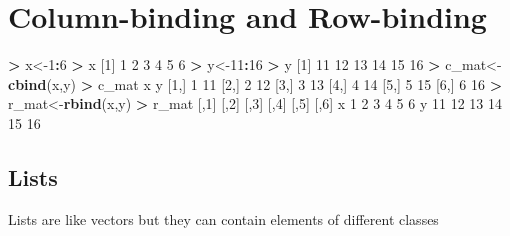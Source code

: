 \documentclass[]{article}
\newenvironment{Shaded}{\begin{snugshade}}{\end{snugshade}}
\newcommand{\KeywordTok}[1]{\textcolor[rgb]{0.13,0.29,0.53}{\textbf{#1}}}
\newcommand{\DecValTok}[1]{\textcolor[rgb]{0.00,0.00,0.81}{#1}}
\newcommand{\StringTok}[1]{\textcolor[rgb]{0.31,0.60,0.02}{#1}}
\newcommand{\OperatorTok}[1]{\textcolor[rgb]{0.81,0.36,0.00}{\textbf{#1}}}
\newcommand{\NormalTok}[1]{#1}
\begin{document}
\section{Column-binding and
Row-binding}\label{column-binding-and-row-binding}

\begin{Shaded}
\begin{Highlighting}[]
\OperatorTok{>}\StringTok{ }\NormalTok{x<-}\DecValTok{1}\OperatorTok{:}\DecValTok{6}
\OperatorTok{>}\StringTok{ }\NormalTok{x}
\NormalTok{[}\DecValTok{1}\NormalTok{] }\DecValTok{1} \DecValTok{2} \DecValTok{3} \DecValTok{4} \DecValTok{5} \DecValTok{6}
\OperatorTok{>}\StringTok{ }\NormalTok{y<-}\DecValTok{11}\OperatorTok{:}\DecValTok{16}
\OperatorTok{>}\StringTok{ }\NormalTok{y}
\NormalTok{[}\DecValTok{1}\NormalTok{] }\DecValTok{11} \DecValTok{12} \DecValTok{13} \DecValTok{14} \DecValTok{15} \DecValTok{16}
\OperatorTok{>}\StringTok{ }\NormalTok{c_mat<-}\KeywordTok{cbind}\NormalTok{(x,y)}
\OperatorTok{>}\StringTok{ }\NormalTok{c_mat}
\NormalTok{     x  y}
\NormalTok{[}\DecValTok{1}\NormalTok{,] }\DecValTok{1} \DecValTok{11}
\NormalTok{[}\DecValTok{2}\NormalTok{,] }\DecValTok{2} \DecValTok{12}
\NormalTok{[}\DecValTok{3}\NormalTok{,] }\DecValTok{3} \DecValTok{13}
\NormalTok{[}\DecValTok{4}\NormalTok{,] }\DecValTok{4} \DecValTok{14}
\NormalTok{[}\DecValTok{5}\NormalTok{,] }\DecValTok{5} \DecValTok{15}
\NormalTok{[}\DecValTok{6}\NormalTok{,] }\DecValTok{6} \DecValTok{16}
\OperatorTok{>}\StringTok{ }\NormalTok{r_mat<-}\KeywordTok{rbind}\NormalTok{(x,y)}
\OperatorTok{>}\StringTok{ }\NormalTok{r_mat}
\NormalTok{  [,}\DecValTok{1}\NormalTok{] [,}\DecValTok{2}\NormalTok{] [,}\DecValTok{3}\NormalTok{] [,}\DecValTok{4}\NormalTok{] [,}\DecValTok{5}\NormalTok{] [,}\DecValTok{6}\NormalTok{]}
\NormalTok{x    }\DecValTok{1}    \DecValTok{2}    \DecValTok{3}    \DecValTok{4}    \DecValTok{5}    \DecValTok{6}
\NormalTok{y   }\DecValTok{11}   \DecValTok{12}   \DecValTok{13}   \DecValTok{14}   \DecValTok{15}   \DecValTok{16}
\end{Highlighting}
\end{Shaded}

\subsection{Lists}\label{lists}

Lists are like vectors but they can contain elements of different
classes
\end{document}
